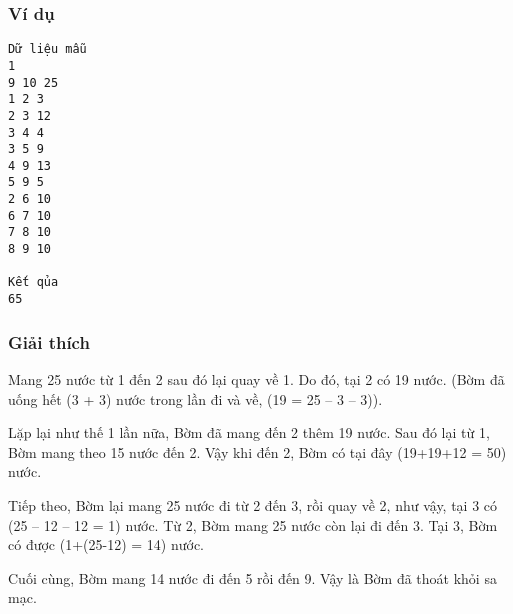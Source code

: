\subsubsection{Ví dụ}
\begin{verbatim}
Dữ liệu mẫu
1
9 10 25 
1 2 3 
2 3 12 
3 4 4 
3 5 9 
4 9 13 
5 9 5 
2 6 10 
6 7 10 
7 8 10 
8 9 10 

Kết qủa
65 
\end{verbatim}

\subsubsection{Giải thích}

Mang 25 nước từ 1 đến 2 sau đó lại quay về 1. Do đó, tại 2 có 19 nước. (Bờm đã uống hết (3 + 3) nước trong lần đi và về, (19 = 25 – 3 – 3)).

Lặp lại như thế 1 lần nữa, Bờm đã mang đến 2 thêm 19 nước. Sau đó lại từ 1, Bờm mang theo 15 nước đến 2. Vậy khi đến 2, Bờm có tại đây (19+19+12 = 50) nước.

Tiếp theo, Bờm lại mang 25 nước đi từ 2 đến 3, rồi quay về 2, như vậy, tại 3 có (25 – 12 – 12 = 1) nước. Từ 2, Bờm mang 25 nước còn lại đi đến 3. Tại 3, Bờm có được (1+(25-12) = 14) nước.

Cuối cùng, Bờm mang 14 nước đi đến 5 rồi đến 9. Vậy là Bờm đã thoát khỏi sa mạc.
